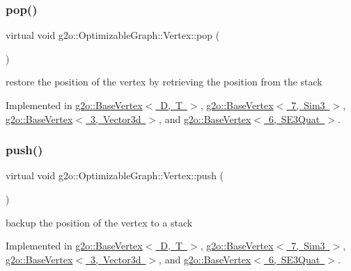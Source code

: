 \subsubsection{\texorpdfstring{pop()}{pop()}}
{\footnotesize\ttfamily virtual void g2o\+::\+Optimizable\+Graph\+::\+Vertex\+::pop (\begin{DoxyParamCaption}{ }\end{DoxyParamCaption})\hspace{0.3cm}{\ttfamily [pure virtual]}}



restore the position of the vertex by retrieving the position from the stack 



Implemented in \mbox{\hyperlink{classg2o_1_1_base_vertex_a502bf3db2ee32061a2c8257ef81a1552}{g2o\+::\+Base\+Vertex$<$ D, T $>$}}, \mbox{\hyperlink{classg2o_1_1_base_vertex_a502bf3db2ee32061a2c8257ef81a1552}{g2o\+::\+Base\+Vertex$<$ 7, Sim3 $>$}}, \mbox{\hyperlink{classg2o_1_1_base_vertex_a502bf3db2ee32061a2c8257ef81a1552}{g2o\+::\+Base\+Vertex$<$ 3, Vector3d $>$}}, and \mbox{\hyperlink{classg2o_1_1_base_vertex_a502bf3db2ee32061a2c8257ef81a1552}{g2o\+::\+Base\+Vertex$<$ 6, S\+E3\+Quat $>$}}.

\mbox{\label{classg2o_1_1_optimizable_graph_1_1_vertex_aa477ed33d30a01ed468f33bb2a2f2d9d}} 
\subsubsection{\texorpdfstring{push()}{push()}}
{\footnotesize\ttfamily virtual void g2o\+::\+Optimizable\+Graph\+::\+Vertex\+::push (\begin{DoxyParamCaption}{ }\end{DoxyParamCaption})\hspace{0.3cm}{\ttfamily [pure virtual]}}



backup the position of the vertex to a stack 



Implemented in \mbox{\hyperlink{classg2o_1_1_base_vertex_ae6edf93fe07aa27579a9352faa83098c}{g2o\+::\+Base\+Vertex$<$ D, T $>$}}, \mbox{\hyperlink{classg2o_1_1_base_vertex_ae6edf93fe07aa27579a9352faa83098c}{g2o\+::\+Base\+Vertex$<$ 7, Sim3 $>$}}, \mbox{\hyperlink{classg2o_1_1_base_vertex_ae6edf93fe07aa27579a9352faa83098c}{g2o\+::\+Base\+Vertex$<$ 3, Vector3d $>$}}, and \mbox{\hyperlink{classg2o_1_1_base_vertex_ae6edf93fe07aa27579a9352faa83098c}{g2o\+::\+Base\+Vertex$<$ 6, S\+E3\+Quat $>$}}.

